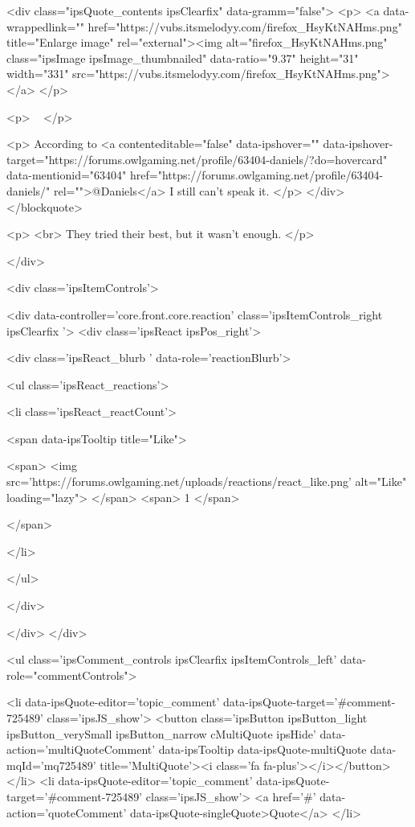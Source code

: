 	<div class="ipsQuote_contents ipsClearfix" data-gramm="false">
		<p>
			<a data-wrappedlink="" href="https://vubs.itsmelodyy.com/firefox_HsyKtNAHms.png" title="Enlarge image" rel="external"><img alt="firefox_HsyKtNAHms.png" class="ipsImage ipsImage_thumbnailed" data-ratio="9.37" height="31" width="331" src="https://vubs.itsmelodyy.com/firefox_HsyKtNAHms.png"></a>
		</p>

		<p>
			 
		</p>

		<p>
			According to <a contenteditable="false" data-ipshover="" data-ipshover-target="https://forums.owlgaming.net/profile/63404-daniels/?do=hovercard" data-mentionid="63404" href="https://forums.owlgaming.net/profile/63404-daniels/" rel="">@Daniels</a> I still can't speak it.
		</p>
	</div>
</blockquote>

<p>
	<br>
	They tried their best, but it wasn't enough.
</p>


			
		</div>

		
			<div class='ipsItemControls'>
				
					
						

	<div data-controller='core.front.core.reaction' class='ipsItemControls_right ipsClearfix '>	
		<div class='ipsReact ipsPos_right'>
			
				
				<div class='ipsReact_blurb ' data-role='reactionBlurb'>
					
						

	
	<ul class='ipsReact_reactions'>
		
		
			
				
				<li class='ipsReact_reactCount'>
					
						<span data-ipsTooltip title="Like">
					
							<span>
								<img src='https://forums.owlgaming.net/uploads/reactions/react_like.png' alt="Like" loading="lazy">
							</span>
							<span>
								1
							</span>
					
						</span>
					
				</li>
			
		
	</ul>

					
				</div>
			
			
			
		</div>
	</div>

					
				
				<ul class='ipsComment_controls ipsClearfix ipsItemControls_left' data-role="commentControls">
					
						
							<li data-ipsQuote-editor='topic_comment' data-ipsQuote-target='#comment-725489' class='ipsJS_show'>
								<button class='ipsButton ipsButton_light ipsButton_verySmall ipsButton_narrow cMultiQuote ipsHide' data-action='multiQuoteComment' data-ipsTooltip data-ipsQuote-multiQuote data-mqId='mq725489' title='MultiQuote'><i class='fa fa-plus'></i></button>
							</li>
							<li data-ipsQuote-editor='topic_comment' data-ipsQuote-target='#comment-725489' class='ipsJS_show'>
								<a href='#' data-action='quoteComment' data-ipsQuote-singleQuote>Quote</a>
							</li>
						
